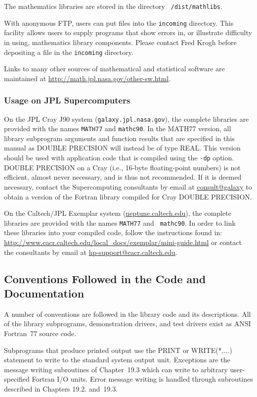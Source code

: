 \documentclass[twoside]{MATH77}
\begin{document}
The mathematics libraries are stored in the directory {\tt
/dist/mathlibs}.

With anonymous FTP, users can put files into the {\tt incoming} directory.
This facility allows users to supply programs that show errors in, or
illustrate difficulty in using, mathematics library components.  Please
contact Fred Krogh before depositing a file in the {\tt incoming}
directory.

Links to many other sources of mathematical and statistical software are
maintained at \url{http://math.jpl.nasa.gov/other-sw.html}.

\subsubsection{Usage on JPL Supercomputers}

On the JPL Cray J90 system ({\tt galaxy.jpl.nasa.gov}), the complete
libraries are provided with the names {\tt MATH77} and {\tt mathc90}.  In
the MATH77 version, all library subprogram arguments and function results
that are specified in this manual as DOUBLE PRECISION will instead be of
type REAL.  This version should be used with application code that is
compiled using the {\tt -dp} option.  DOUBLE PRECISION on a Cray (i.e.,
16-byte floating-point numbers) is not efficient, almost never necessary,
and is thus not recommended.  If it is deemed necessary, contact the
Supercomputing consultants by email at \url{consult@galaxy} to obtain a
version of the Fortran library compiled for Cray DOUBLE PRECISION.

On the Caltech/JPL Exemplar system (\url{neptune.caltech.edu}), the
complete libraries are provided with the names {\tt MATH77} and {\tt
mathc90}.  In order to link these libraries into your compiled code,
follow the instructions found in: \url{
http://www.cacr.caltech.edu/local_docs/exemplar/mini-guide.html} or
contact the consultants by email at \url{hp-support@cacr.caltech.edu}.
\fi

\subsection{Conventions Followed in the Code and Documentation}

A number of conventions are followed in the library code and its
descriptions. All of the library subprograms, demonstration drivers,
and test drivers exist as ANSI Fortran~77 source code.

Subprograms that produce printed output use the PRINT or WRITE(*,...)
statement to write to the standard system output unit. Exceptions are the
message writing subroutines of Chapter~19.3 which can write to arbitrary
user-specified Fortran I/O units. Error message writing is handled through
subroutines described in Chapters 19.2. and~19.3.
\end{document}
